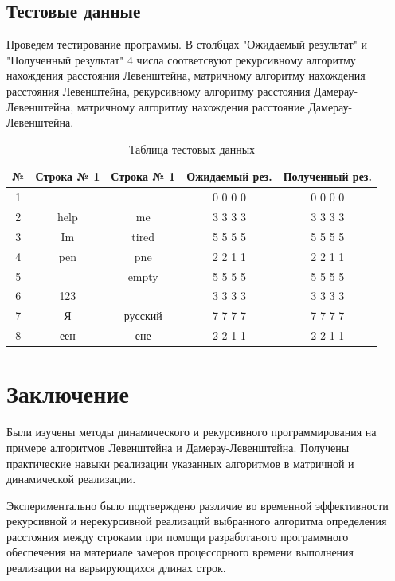 \documentclass[12pt, a4paper]{report}
\begin{document}
\section{Тестовые данные}

\par
Проведем тестирование программы. В столбцах "Ожидаемый результат" и "Полученный результат" 4 числа соответсвуют рекурсивному алгоритму нахождения расстояния Левенштейна, матричному алгоритму нахождения расстояния Левенштейна, рекурсивному алгоритму расстояния Дамерау-Левенштейна, матричному алгоритму нахождения расстояние Дамерау-Левенштейна.

\begin{table} [H]
\begin{center}
	\caption{Таблица тестовых данных}
	\begin{tabular}{|c c c c c|} 
 	\hline
	№ &  Строка № 1 & Строка № 1 & Ожидаемый рез. & Полученный рез. \\ [0.8ex] 
 	\hline
 	1 &  &  & 0 0 0 0 & 0 0 0 0\\
 	\hline
 	2 & help & me & 3 3 3 3 & 3 3 3 3\\
 	\hline
	3 & Im & tired & 5 5 5 5  & 5 5 5 5\\
	\hline
	4 & pen & pne & 2 2 1 1 & 2 2 1 1\\
	\hline
	5 &  & empty & 5 5 5 5 & 5 5 5 5\\
	\hline
	6 & 123 &  & 3 3 3 3 & 3 3 3 3\\
	\hline
	7 & Я & русский & 7 7 7 7  & 7 7 7 7\\
	\hline
	8 & еен & ене & 2 2 1 1 & 2 2 1 1\\
	\hline
	\end{tabular}
\end{center}
\end{table}



\chapter*{Заключение}
Были изучены методы динамического и рекурсивного программирования на примере алгоритмов Левенштейна и Дамерау-Левенштейна. Получены практические навыки реализации указанных алгоритмов в матричной и динамической реализации.

Экспериментально было подтверждено различие во временной эффективности рекурсивной и нерекурсивной реализаций выбранного алгоритма определения расстояния между строками при помощи разработаного программного обеспечения на материале замеров процессорного времени выполнения реализации на варьирующихся длинах строк. 
\end{document}
